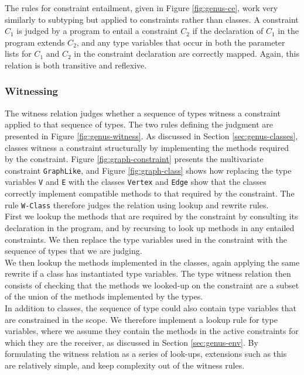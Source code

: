 The rules for constraint entailment, given in Figure \ref{fig:genus-ce}, work very similarly to subtyping but applied to constraints rather than classes. A constraint $C_1$ is judged by a program to entail a constraint $C_2$ if the declaration of $C_1$ in the program extends $C_2$, and any type variables that occur in both the parameter lists for $C_1$ and $C_2$ in the constraint declaration are correctly mapped. Again, this relation is both transitive and reflexive.

\subsubsection{Witnessing}

The witness relation judges whether a sequence of types witness a constraint applied to that sequence of types. The two rules defining the judgment are presented in Figure \ref{fig:genus-witness}. As discussed in Section \ref{sec:genus-classes}, classes witness a constraint structurally by implementing the methods required by the constraint. Figure \ref{fig:graph-constraint} presents the multivariate constraint \texttt{GraphLike}, and Figure \ref{fig:graph-class} shows how replacing the type variables \texttt{V} and \texttt{E} with the classes \texttt{Vertex} and \texttt{Edge} show that the classes correctly implement compatible methods to that required by the constraint. The rule \texttt{W-Class} therefore judges the relation using lookup and rewrite rules. \\

First we lookup the methods that are required by the constraint by consulting its declaration in the program, and by recursing to look up methods in any entailed constraints. We then replace the type variables used in the constraint with the sequence of types that we are judging. \\

We then lookup the methods implemented in the classes, again applying the same rewrite if a class has instantiated type variables. The type witness relation then consists of checking that the methods we looked-up on the constraint are a subset of the union of the methods implemented by the types. \\

In addition to classes, the sequence of type could also contain type variables that are constrained in the scope. We therefore implement a lookup rule for type variables, where we assume they contain the methods in the active constraints for which they are the receiver, as discussed in Section \ref{sec:genus-env}. By formulating the witness relation as a series of look-ups, extensions such as this are relatively simple, and keep complexity out of the witness rules. \\

